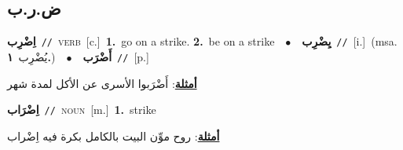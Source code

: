 \documentclass[10pt,a4paper,twoside]{article} %
\begin{document}
\begin{multicols}{2}
{{{{{{{{{{\vspace{-3mm}
\subsection*{\color{blue}\foreignlanguage{arabic}{ض.ر.ب}\color{blue}{}} 

{\setlength\topsep{0pt}\textbf{\foreignlanguage{arabic}{اِضْرِب}}\ {\color{gray}\texttt{//}\color{black}}\ \textsc{verb}\ [c.]\ \textbf{1.}~go on a strike.  \textbf{2.}~be on a strike\ \ $\bullet$\ \ \setlength\topsep{0pt}\textbf{\foreignlanguage{arabic}{يِضْرِب}}\ {\color{gray}\texttt{//}\color{black}}\ [i.]\ \color{gray}(msa. \foreignlanguage{arabic}{يُضْرِب}~\foreignlanguage{arabic}{\textbf{١.}})\color{black}\ \ $\bullet$\ \ \setlength\topsep{0pt}\textbf{\foreignlanguage{arabic}{أَضْرَب}}\ {\color{gray}\texttt{//}\color{black}}\ [p.]\  \begin{flushright}\color{gray}\foreignlanguage{arabic}{\textbf{\underline{\foreignlanguage{arabic}{أمثلة}}}: أَضْرَبوا الأسرى عن الأكل لمدة شهر}\end{flushright}\color{black}} \vspace{2mm}

{\setlength\topsep{0pt}\textbf{\foreignlanguage{arabic}{اِضْرَاب}}\ {\color{gray}\texttt{//}\color{black}}\ \textsc{noun}\ [m.]\ \textbf{1.}~strike\  \begin{flushright}\color{gray}\foreignlanguage{arabic}{\textbf{\underline{\foreignlanguage{arabic}{أمثلة}}}: روح موِّن البيت بالكامل بكرة فيه اِضْراب}\end{flushright}\color{black}} \vspace{2mm}

}}}}}}}}}}
\end{multicols}
\end{document}
